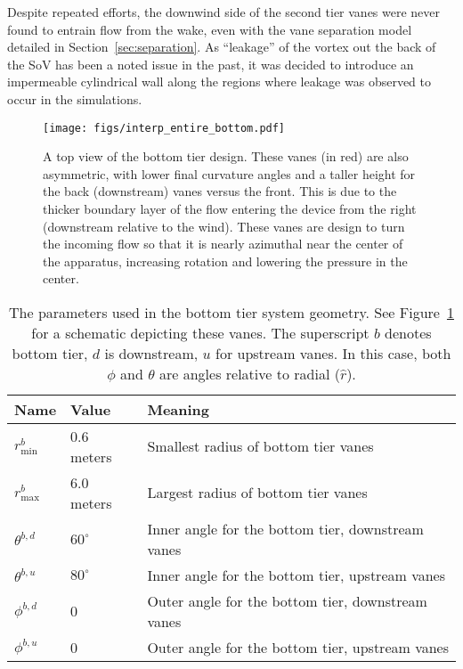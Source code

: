Despite repeated efforts, the downwind side of the second tier vanes were
never found to entrain flow from the wake, even with the vane separation
model detailed in Section~\ref{sec:separation}. As ``leakage'' of the
vortex out the back of the SoV has been a noted issue in the past, it
was decided to introduce an impermeable cylindrical wall along the
regions where leakage was observed to occur in the simulations. 

 \begin{figure}[!htb]
  \begin{center}
   \texttt{[image: figs/interp\_entire\_bottom.pdf]}
   \caption{A top view of the bottom tier design. These vanes (in red)
   are also asymmetric, with lower final curvature angles and a taller
   height for the back (downstream) vanes versus the front. This is due
   to the thicker boundary layer of the flow entering the device from
   the right (downstream relative to the wind). These vanes are design
   to turn the incoming flow so that it is nearly azimuthal near the
   center of the apparatus, increasing rotation and lowering the
   pressure in the center.}
   \label{fig:bottom_design}
  \end{center}
 \end{figure}

\begin{table}[!htb]
\centering
 \caption{The parameters used in the bottom tier system geometry. See 
 Figure~\ref{fig:bottom_design} for a schematic depicting these
 vanes. The superscript $b$ denotes bottom tier, $d$ is downstream, $u$
 for upstream vanes. In this case, both $\phi$ and $\theta$ are angles
 relative to radial ($\hat r$). }
\begin{tabular}{l|l|l}
Name                        & Value & Meaning                    \\
 \hline
$r^b_{\text{min}}$          &  0.6 meters & Smallest radius of bottom tier vanes \\
$r^b_{\text{max}}$          &  6.0 meters & Largest radius of bottom tier vanes \\
$\theta^{b,d}$ &  $60^{\circ}$   & Inner angle for the bottom tier, downstream vanes \\
$\theta^{b,u}$ &  $80^{\circ}$   & Inner angle for the bottom tier, upstream vanes \\
$\phi^{b,d}$ &   0   & Outer angle for the bottom  tier, downstream vanes \\
$\phi^{b,u}$ &   0   & Outer angle for the bottom tier, upstream vanes \\
\end{tabular}
 \label{tab:bottom}
\end{table}

